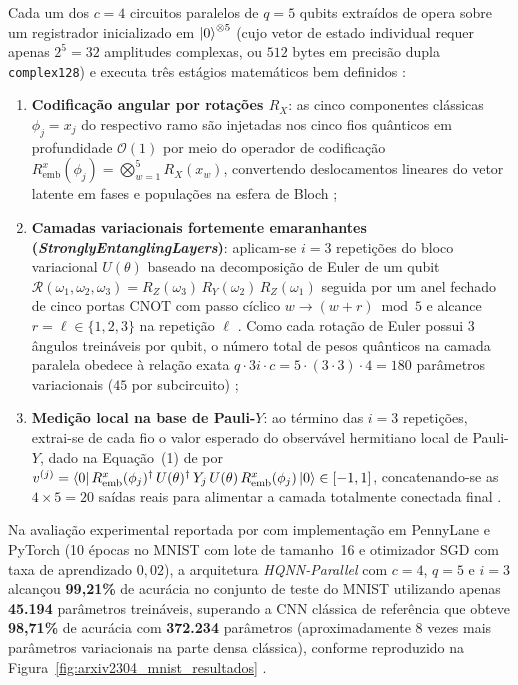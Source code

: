 \documentclass[
    12pt,
    openright,
    oneside,
    a4paper,
    english,
    brazil
]{abntex2}
\begin{document}
Cada um dos \(c = 4\) circuitos paralelos de \(q = 5\) qubits extraídos de  opera sobre um registrador inicializado em \(\ket{0}^{\otimes 5}\) (cujo vetor de estado individual requer apenas \(2^5 = 32\) amplitudes complexas, ou \(512\text{ bytes}\) em precisão dupla \texttt{complex128}) e executa três estágios matemáticos bem definidos \cite{senokosov2024qml,bergholm2018pennylane,pennylaneDocsSEL2026}:
\begin{enumerate}
    \item \textbf{Codificação angular por rotações \(R_X\)}: as cinco componentes clássicas \(\phi_j = x_j\) do respectivo ramo são injetadas nos cinco fios quânticos em profundidade \(\mathcal{O}(1)\) por meio do operador de codificação \(R_{\text{emb}}^x(\phi_j) = \bigotimes_{w=1}^{5} R_X(x_w)\), convertendo deslocamentos lineares do vetor latente em fases e populações na esfera de Bloch \cite{senokosov2024qml,schuld2021effect};
    \item \textbf{Camadas variacionais fortemente emaranhantes (\textit{Strongly\-Entangling\-Layers})}: aplicam-se \(i = 3\) repetições do bloco variacional \(U(\theta)\) baseado na decomposição de Euler de um qubit \(\mathcal{R}(\omega_1,\omega_2,\omega_3) = \allowbreak R_Z(\omega_3)\,R_Y(\omega_2)\,R_Z(\omega_1)\) seguida por um anel fechado de cinco portas \(\text{CNOT}\) com passo cíclico \(w \to (w + r)\bmod 5\) e alcance \(r = \ell \in \{1, 2, 3\}\) na repetição \(\ell\) \cite{senokosov2024qml,nielsen2010quantum,bergholm2018pennylane,pennylaneDocsSEL2026}. Como cada rotação de Euler possui 3 ângulos treináveis por qubit, o número total de pesos quânticos na camada paralela obedece à relação exata \(q \cdot 3i \cdot c = 5 \cdot (3 \cdot 3) \cdot 4 = 180\) parâmetros variacionais (\(45\) por subcircuito) \cite{senokosov2024qml};
    \item \textbf{Medição local na base de Pauli-\(Y\)}: ao término das \(i = 3\) repetições, extrai-se de cada fio o valor esperado do observável hermitiano local de Pauli-\(Y\), dado na Equação~(1) de  por \(v^{(j)} = \bra{0} R_{\text{emb}}^x(\phi_j)^\dagger\, U(\theta)^\dagger\, Y_j\, U(\theta)\, R_{\text{emb}}^x(\phi_j) \ket{0} \in [-1, 1]\), concatenando-se as \(4 \times 5 = 20\) saídas reais para alimentar a camada totalmente conectada final \cite{senokosov2024qml,cerezo2021variational}.
\end{enumerate}

Na avaliação experimental reportada por  com implementação em PennyLane e PyTorch \cite{bergholm2018pennylane,paszke2019pytorch} (10 épocas no MNIST com lote de tamanho~16 e otimizador SGD com taxa de aprendizado \(0{,}02\)), a arquitetura \textit{HQNN-Parallel} com \(c=4\), \(q=5\) e \(i=3\) alcançou \textbf{99,21\%} de acurácia no conjunto de teste do MNIST utilizando apenas \textbf{45.194} parâmetros treináveis, superando a CNN clássica de referência que obteve \textbf{98,71\%} de acurácia com \textbf{372.234} parâmetros (aproximadamente \(8\) vezes mais parâmetros variacionais na parte densa clássica), conforme reproduzido na Figura~\ref{fig:arxiv2304_mnist_resultados} \cite{senokosov2024qml}.
\end{document}
